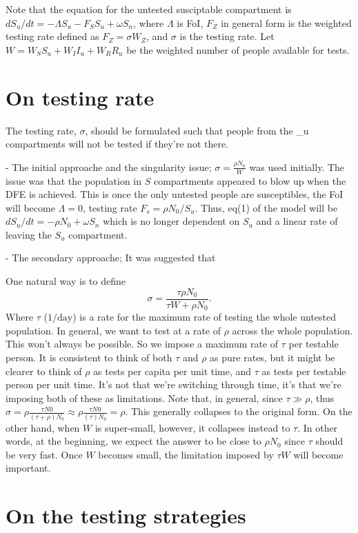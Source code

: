 Note that the equation for the untested susciptable compartment is $d S_u/dt = -\Lambda S_u - F_S S_u + \omega S_n$, where $\Lambda$ is FoI, $F_Z$ in general form is the weighted testing rate defined as $F_Z=\sigma W_Z$, and $\sigma$ is the testing rate. Let $W = W_S S_u + W_I I_u + W_R R_u$ be the weighted number of people available for tests.

\section{On testing rate}

The testing rate, $\sigma$, should be formulated such that people from the \_u compartments will not be tested if they're not there.

- The initial approache and the singularity issue;
$\sigma = \frac{\rho N_0}{W}$ was used initially. The issue was that the population in $S$ compartments appeared to blow up when the DFE is achieved. This is  once the only untested people are susceptibles, the FoI will become $\Lambda=0$, testing rate $F_s=\rho N_0/S_u$. Thus, eq(1) of the model will be $d S_u/dt = - \rho N_0 + \omega S_n$ which is no longer dependent on $S_u$ and a linear rate of leaving the $S_u$ compartment.

- The secondary approache;
It was suggested that 

One natural way is to define $$\sigma = \frac{\tau \rho N_0}{\tau W + \rho N_0}.$$
Where  $\tau$ ($1/ \mathrm{day}$) is a rate for the maximum rate of testing the whole untested population. In general, we want to test at a rate of $\rho$ across the whole population. This won't always be possible. So we impose a maximum rate of $\tau$ per testable person. It is consistent to think of both $\tau$ and $\rho$ as pure rates, but it might be clearer to think of $\rho$ as tests per capita per unit time, and $\tau$ as tests per testable person per unit time. It's not that we're switching through time, it's that we're imposing both of these as limitations. Note that, in general, since $\tau \gg \rho$, thus $\sigma=\rho \frac{\tau N0}{(\tau+\rho)N_0} \approx \rho \frac{\tau N0}{(\tau)N_0} = \rho$. This generally collapses to the original form. On the other hand, when $W$ is super-small, however, it collapses instead to $\tau$.
  In other words, at the beginning, we expect the answer to be close to $\rho N_0$ since $\tau$ should be very fast. Once $W$ becomes small, the limitation imposed by $\tau W$ will become important.

\section{ On the testing strategies}

